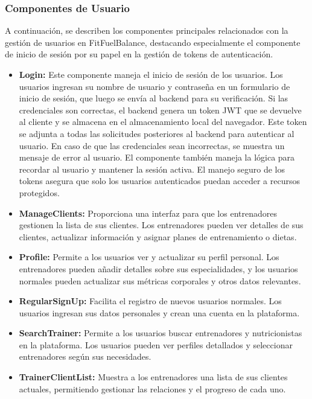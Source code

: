 \subsubsection{Componentes de Usuario}
A continuación, se describen los componentes principales relacionados con la gestión de usuarios en FitFuelBalance, destacando especialmente el componente de inicio de sesión por su papel en la gestión de tokens de autenticación.

\begin{itemize}
    \item \textbf{Login:} Este componente maneja el inicio de sesión de los usuarios. Los usuarios ingresan su nombre de usuario y contraseña en un formulario de inicio de sesión, que luego se envía al backend para su verificación. Si las credenciales son correctas, el backend genera un token JWT que se devuelve al cliente y se almacena en el almacenamiento local del navegador. Este token se adjunta a todas las solicitudes posteriores al backend para autenticar al usuario. En caso de que las credenciales sean incorrectas, se muestra un mensaje de error al usuario. El componente también maneja la lógica para recordar al usuario y mantener la sesión activa. El manejo seguro de los tokens asegura que solo los usuarios autenticados puedan acceder a recursos protegidos.

    \item \textbf{ManageClients:} Proporciona una interfaz para que los entrenadores gestionen la lista de sus clientes. Los entrenadores pueden ver detalles de sus clientes, actualizar información y asignar planes de entrenamiento o dietas.
    
    \item \textbf{Profile:} Permite a los usuarios ver y actualizar su perfil personal. Los entrenadores pueden añadir detalles sobre sus especialidades, y los usuarios normales pueden actualizar sus métricas corporales y otros datos relevantes.
    
    \item \textbf{RegularSignUp:} Facilita el registro de nuevos usuarios normales. Los usuarios ingresan sus datos personales y crean una cuenta en la plataforma.
    
    \item \textbf{SearchTrainer:} Permite a los usuarios buscar entrenadores y nutricionistas en la plataforma. Los usuarios pueden ver perfiles detallados y seleccionar entrenadores según sus necesidades.
    
    \item \textbf{TrainerClientList:} Muestra a los entrenadores una lista de sus clientes actuales, permitiendo gestionar las relaciones y el progreso de cada uno.
    

\end{itemize}
